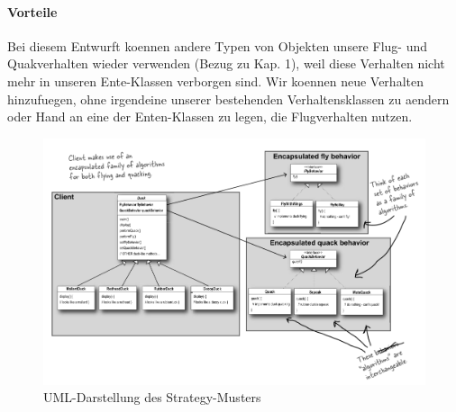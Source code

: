 \paragraph{Vorteile}
Bei  diesem  Entwurft  koennen  andere Typen  von  Objekten unsere  Flug- und  Quakverhalten  wieder
verwenden (Bezug zu Kap. 1), weil diese Verhalten nicht mehr in unseren Ente-Klassen verborgen sind.
Wir  koennen  neue Verhalten hinzufuegen, ohne  irgendeine unserer bestehenden  Verhaltensklassen zu
aendern oder Hand an eine der Enten-Klassen zu legen, die Flugverhalten nutzen. 

\begin{figure}
	\centering
	\includegraphics[width=\linewidth]{strategy/img/strategyUML}
	\caption{UML-Darstellung des Strategy-Musters}
	\label{fig:strategyUML}
\end{figure}